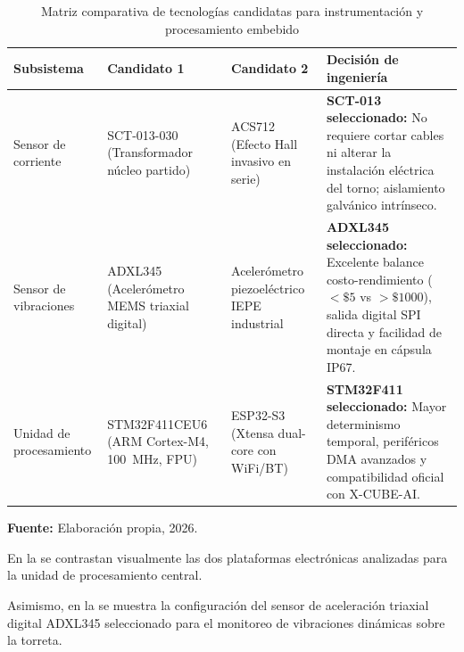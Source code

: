 \begin{table}[H]
\centering
\caption{Matriz comparativa de tecnologías candidatas para instrumentación y procesamiento embebido}\label{tab:comparativa_componentes}
\vspace{2mm}
\small
\begin{tabular}{|p{2.6cm}|p{2.8cm}|p{3.2cm}|p{4.6cm}|}
\hline
\textbf{Subsistema} & \textbf{Candidato 1} & \textbf{Candidato 2} & \textbf{Decisión de ingeniería} \\ \hline \hline
Sensor de corriente & SCT-013-030 (Transformador núcleo partido) & ACS712 (Efecto Hall invasivo en serie) & \textbf{SCT-013 seleccionado:} No requiere cortar cables ni alterar la instalación eléctrica del torno; aislamiento galvánico intrínseco. \\ \hline
Sensor de vibraciones & ADXL345 (Acelerómetro MEMS triaxial digital) & Acelerómetro piezoeléctrico IEPE industrial & \textbf{ADXL345 seleccionado:} Excelente balance costo-rendimiento ($<\$5$ vs $>\$1000$), salida digital SPI directa y facilidad de montaje en cápsula IP67. \\ \hline
Unidad de procesamiento & STM32F411CEU6 (ARM Cortex-M4, 100~MHz, FPU) & ESP32-S3 (Xtensa dual-core con WiFi/BT) & \textbf{STM32F411 seleccionado:} Mayor determinismo temporal, periféricos DMA avanzados y compatibilidad oficial con X-CUBE-AI. \\ \hline
\end{tabular}
\par\vspace{2mm}
\footnotesize \textbf{Fuente:} Elaboración propia, 2026.
\end{table}

En la  se contrastan visualmente las dos plataformas electrónicas analizadas para la unidad de procesamiento central.


Asimismo, en la  se muestra la configuración del sensor de aceleración triaxial digital ADXL345 seleccionado para el monitoreo de vibraciones dinámicas sobre la torreta.


